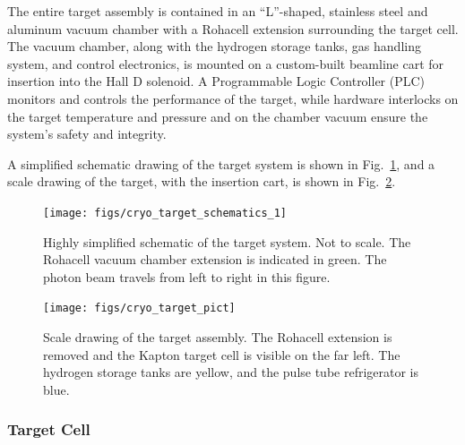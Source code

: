 The entire target assembly is contained in an ``L''-shaped,
stainless steel and aluminum vacuum chamber with a Rohacell extension
surrounding the target cell.  The vacuum chamber, along with the
hydrogen storage tanks, gas handling system, and control electronics,
is mounted on a custom-built beamline cart for insertion into the Hall
D solenoid.  A Programmable Logic Controller (PLC) monitors and
controls the performance of the target, while hardware interlocks on
the target temperature and pressure and on the chamber vacuum ensure
the system's safety and integrity.

A simplified schematic drawing of the target system is shown in 
Fig.~\ref{fig:tgt:scheme}, and a scale drawing of the target, 
with the insertion cart, is shown in Fig.~\ref{fig:tgt:pict}.


\begin{figure}[h]
\begin{center}
    \texttt{[image: figs/cryo\_target\_schematics\_1]}
\end{center}
\caption{
Highly simplified schematic of the target system.  Not to scale.  The
Rohacell vacuum chamber extension is indicated in green.  The photon
beam travels from left to right in this figure.
\label{fig:tgt:scheme}}
\end{figure}


\begin{figure}[h]
\begin{center}
      \texttt{[image: figs/cryo\_target\_pict]}
\end{center}
\caption{
Scale drawing of the target assembly.  The Rohacell extension is
removed and the Kapton target cell is visible on the far left.  The
hydrogen storage tanks are yellow, and the pulse tube refrigerator is
blue.
\label{fig:tgt:pict}}
\end{figure}


\subsubsection[Target Cell]{Target Cell \label{sec:tgt:cell}}

